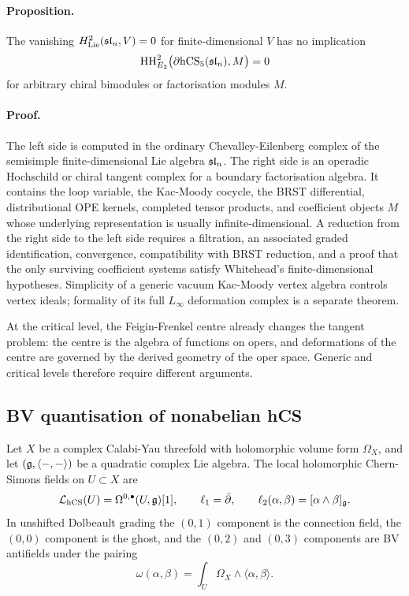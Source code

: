 \paragraph{Proposition.}
The vanishing
$H^2_{\mathrm{Lie}}(\mathfrak{sl}_n,V)=0$ for finite-dimensional $V$ has no
implication
\[
  \mathrm{HH}^2_{E_2}\bigl(\partial\mathrm{hCS}_5(\mathfrak{sl}_n),M\bigr)=0
\]
for arbitrary chiral bimodules or factorisation modules $M$.

\paragraph{Proof.}
The left side is computed in the ordinary Chevalley-Eilenberg complex
of the semisimple finite-dimensional Lie algebra $\mathfrak{sl}_n$. The right side
is an operadic Hochschild or chiral tangent complex for a boundary
factorisation algebra. It contains the loop variable, the
Kac-Moody cocycle, the BRST differential, distributional OPE kernels,
completed tensor products, and coefficient objects $M$ whose underlying
representation is usually infinite-dimensional. A reduction from the
right side to the left side requires a filtration, an associated graded
identification, convergence, compatibility with BRST reduction, and a
proof that the only surviving coefficient systems satisfy Whitehead's
finite-dimensional hypotheses. Simplicity of a generic vacuum
Kac-Moody vertex algebra controls vertex ideals; formality of its full
$L_\infty$ deformation complex is a separate theorem.

At the critical level, the Feigin-Frenkel centre already changes the
tangent problem: the centre is the algebra of functions on opers, and
deformations of the centre are governed by the derived geometry of the
oper space. Generic and critical levels therefore require different
arguments.

\subsection{BV quantisation of nonabelian hCS}

Let $X$ be a complex Calabi-Yau threefold with holomorphic volume form
$\Omega_X$, and let $(\mathfrak{g},\langle-,-\rangle)$ be a quadratic complex Lie
algebra. The local holomorphic Chern-Simons fields on $U\subset X$ are
\[
  \mathcal{L}_{\mathrm{hCS}}(U)=\Omega^{0,\bullet}(U,\mathfrak{g})[1],
  \qquad
  \ell_1=\bar\partial,
  \qquad
  \ell_2(\alpha,\beta)=[\alpha\wedge\beta]_{\mathfrak{g}} .
\]
In unshifted Dolbeault grading the $(0,1)$ component is the connection
field, the $(0,0)$ component is the ghost, and the $(0,2)$ and $(0,3)$
components are BV antifields under the pairing
\[
  \omega(\alpha,\beta)
  =
  \int_U \Omega_X\wedge \langle\alpha,\beta\rangle .
\]

